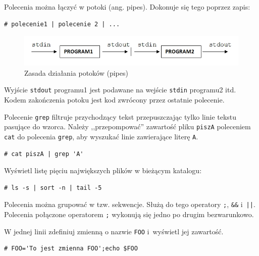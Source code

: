 \begin{example}
Polecenia można łączyć w potoki (ang. pipes). Dokonuje się tego poprzez zapis:

\begin{lstlisting}[style=MyBashStyle]
# polecenie1 | polecenie 2 | ...
\end{lstlisting}

\begin{figure}[!h]
\centering
\includegraphics[width=1.0\textwidth]{img/potoki}
\caption{Zasada działania potoków (pipes)}
\label{fig:potoki}
\end{figure}

Wyjście \lstinline[style=MyBashStyle]{stdout} programu1 jest podawane na wejście \lstinline[style=MyBashStyle]{stdin} programu2 itd. Kodem zakończenia potoku jest kod zwrócony przez ostatnie polecenie.

Polecenie \lstinline[style=MyBashStyle]{grep} filtruje przychodzący tekst przepuszczając tylko linie tekstu pasujące do wzorca. Należy ,,przepompować'' zawartość pliku \lstinline[style=MyBashStyle]{piszA} poleceniem \lstinline[style=MyBashStyle]{cat} do polecenia \lstinline[style=MyBashStyle]{grep}, aby wyszukać linie zawierające literę \lstinline[style=MyBashStyle]{A}.

\begin{lstlisting}[style=MyBashStyle]
# cat piszA | grep 'A'
\end{lstlisting}

\end{example}

\begin{example}

Wyświetl listę pięciu największych plików w bieżącym katalogu:

\begin{lstlisting}[style=MyBashStyle]
# ls -s | sort -n | tail -5
\end{lstlisting}
\end{example}

\begin{example}

Polecenia można grupować w tzw. sekwencje. Służą do tego operatory \lstinline[style=MyBashStyle]{;}, \lstinline[style=MyBashStyle]{&&} i~\lstinline[style=MyBashStyle]{||}. Polecenia połączone operatorem \lstinline[style=MyBashStyle]{;} wykonują się jedno po drugim bezwarunkowo.

W jednej linii zdefiniuj zmienną o nazwie \lstinline[style=MyBashStyle]{FOO} i~wyświetl jej zawartość.

\begin{lstlisting}[style=MyBashStyle]
# FOO='To jest zmienna FOO';echo $FOO
\end{lstlisting}

\end{example}


